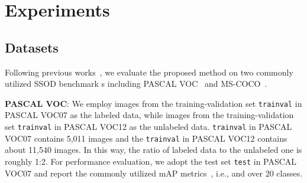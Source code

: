 \documentclass[letterpaper]{article} \usepackage{aaai23}  \usepackage{times}  \usepackage{helvet}  \usepackage{courier}  \usepackage[hyphens]{url}  \usepackage{graphicx} \urlstyle{rm} \def\UrlFont{\rm}  \usepackage{natbib}  \usepackage{caption} \frenchspacing  \setlength{\pdfpagewidth}{8.5in}  \setlength{\pdfpageheight}{11in}  \usepackage{algorithm}
\begin{document}
\section{Experiments}
\subsection{Datasets}
Following previous works~\cite{sohn2020simple,zhou2021instant}, we evaluate the proposed method on two commonly utilized SSOD benchmark
s including PASCAL VOC~\cite{everingham2010pascal} and MS-COCO~\cite{lin2014microsoft}. 

\noindent\textbf{PASCAL VOC}: We employ images from the training-validation set \texttt{trainval} in PASCAL VOC07 as the labeled data, while images from the training-validation set \texttt{trainval} in PASCAL VOC12 as the unlabeled data. \texttt{trainval} in PASCAL VOC07 contains 5,011 images and the \texttt{trainval} in PASCAL VOC12 contains about 11,540 images. In this way, the ratio of labeled data to the unlabeled one is roughly 1:2. For performance evaluation, we adopt the test set \texttt{test} in PASCAL VOC07 and report the commonly utilized mAP metrics~\cite{zhou2021instant,xu2021end}, i.e.,  and  over 20 classes.

\begin{table}[t]  
\centering
\caption{Numerical results of different methods on the PASCAL VOC dataset.} 
\end{table}
\end{document}
